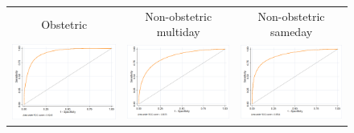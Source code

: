 \documentclass[submission]{grattan}
\begin{document}
\begin{figure}
\begin{tabularx}{\linewidth}{@{}C@{}C@{}C@{}}
Obstetric & Non-obstetric multiday & Non-obstetric sameday \\
\cmidrule(lr){1-1}\cmidrule(lr){2-2}\cmidrule(lr){3-3}
\includegraphics{atlas/ROC_obstetric.png} & \includegraphics{atlas/ROC_non_obs_MD.png} & \includegraphics{atlas/ROC_non_obs_SD.png}
\end{tabularx}
\end{figure}
\end{document}
